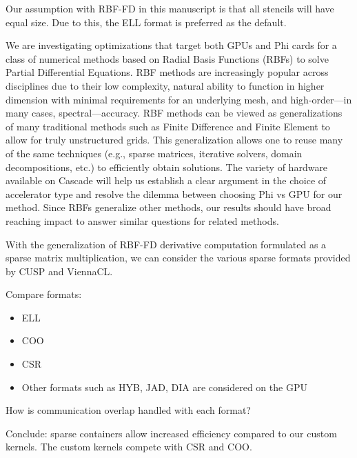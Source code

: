 \documentclass{report}
\begin{document}
Our assumption with RBF-FD in this manuscript is that all stencils will have equal size. Due to this, the ELL format is preferred as the default. 
 



We are investigating optimizations that target both GPUs and Phi cards for a class of numerical methods based on Radial Basis Functions (RBFs) to solve Partial Differential Equations. RBF methods are increasingly popular across disciplines due to their low complexity, natural ability to function in higher dimension with minimal requirements for an underlying mesh, and high-order---in many cases, spectral---accuracy. RBF methods can be viewed as generalizations of many traditional methods such as Finite Difference and Finite Element to allow for truly unstructured grids. This generalization allows one to reuse many of the same techniques (e.g., sparse matrices, iterative solvers, domain decompositions, etc.) to efficiently obtain solutions. The variety of hardware available on Cascade will help us establish a clear argument in the choice of accelerator type and resolve the dilemma between choosing Phi vs GPU for our method. Since RBFs generalize other methods, our results should have broad reaching impact to answer similar questions for related methods.



With the generalization of RBF-FD derivative computation formulated as a sparse matrix multiplication, we can 
consider the various sparse formats provided by CUSP and ViennaCL. 


Compare formats: 
\begin{itemize}
\item ELL
\item COO
\item CSR
\item Other formats such as HYB, JAD, DIA are considered on the GPU
\end{itemize}

How is communication overlap handled with each format? 


Conclude: sparse containers allow increased efficiency compared to our custom kernels. The custom kernels compete with CSR and COO. 
\end{document}
